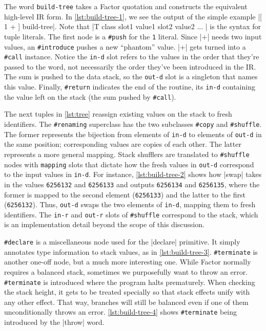 
The word \Verb|build-tree| takes a Factor quotation and constructs the
equivalent high-level \gls{IR} form.  In \vref{lst:build-tree-1}, we see the
output of the simple example
%
\factor|[ 1 + ] build-tree|.
%
Note that
%
\factor|T{ class { slot1 value1 } { slot2 value2 } ... }|
%
is the syntax for tuple literals.  The first node is a \Verb|#push| for the
\Verb|1| literal.  Since \factor|+| needs two input values, an
\Verb|#introduce| pushes a new ``phantom'' value.  \factor|+| gets turned
into a \Verb|#call| instance.  Notice the \Verb|in-d| slot refers to the
values in the order that they're passed to the word, not necessarily the order
they've been introduced in the \gls{IR}.  The sum is pushed to the data stack,
so the \Verb|out-d| slot is a singleton that names this value.  Finally,
\Verb|#return| indicates the end of the routine, its \Verb|in-d| containing
the value left on the stack (the sum pushed by \Verb|#call|).


The next tuples in \vref{lst:tree} reassign existing values on the stack to
fresh identifiers.  The \Verb|#renaming| superclass has the two subclasses
\Verb|#copy| and \Verb|#shuffle|.  The former represents the bijection from
elements of \Verb|in-d| to elements of \Verb|out-d| in the same position;
corresponding values are copies of each other.  The latter represents a more
general mapping.  Stack shufflers are translated to \Verb|#shuffle| nodes
with \Verb|mapping| slots that dictate how the fresh values in \Verb|out-d|
correspond to the input values in \Verb|in-d|.  For instance,
\vref{lst:build-tree-2} shows how \factor|swap| takes in the values
\Verb|6256132| and \Verb|6256133| and outputs \Verb|6256134| and
\Verb|6256135|, where the former is mapped to the second element
(\Verb|6256133|) and the latter to the first (\Verb|6256132|).  Thus,
\Verb|out-d| swaps the two elements of \Verb|in-d|, mapping them to fresh
identifiers.  The \Verb|in-r| and \Verb|out-r| slots of \Verb|#shuffle|
correspond to the  stack, which is an implementation detail beyond
the scope of this discussion.


\Verb|#declare| is a miscellaneous node used for the \factor|declare|
primitive.  It simply annotates type information to stack values, as in
\vref{lst:build-tree-3}.  \Verb|#terminate| is another one-off node, but a
much more interesting one.  While Factor normally requires a balanced stack,
sometimes we purposefully want to throw an error.  \Verb|#terminate| is
introduced where the program halts prematurely.  When checking the stack
height, it gets to be treated specially so that  stack effects
unify with any other effect.  That way, branches will still be balanced even if
one of them unconditionally throws an error.  \vref{lst:build-tree-4} shows
\Verb|#terminate| being introduced by the \factor|throw| word.

